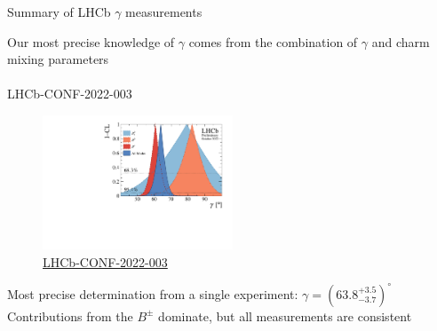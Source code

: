 \documentclass[xcolor={dvipsnames}]{beamer}
\begin{document}
\begin{frame}{Summary of LHCb \texorpdfstring{$\gamma$}{gamma} measurements}
  \begin{center}
    {\Large Our most precise knowledge of $\gamma$ comes from the combination of $\gamma$ and charm mixing parameters}\\~\\
    {\large LHCb-CONF-2022-003}
  \end{center}
  \begin{figure}
    \includegraphics[height=4.0cm]{Plots/gammacharm_lhcb_comp_flavour.pdf}
    \vspace{-0.5cm}
    \caption*{\tiny\href{https://lhcbproject.web.cern.ch/Publications/LHCbProjectPublic/LHCb-CONF-2022-003.html}{LHCb-CONF-2022-003}}
  \end{figure}
  \vspace{-0.5cm}
  \begin{center}
    Most precise determination from a single experiment: $\gamma = (63.8^{+3.5}_{-3.7})^\circ$\\
    Contributions from the $B^\pm$ dominate, but all measurements are consistent
  \end{center}
\end{frame}
\end{document}
